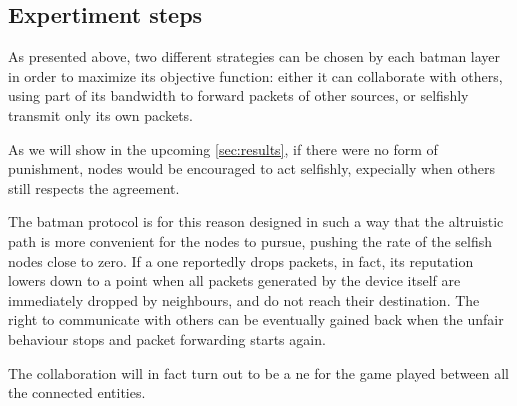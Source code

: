 \documentclass[conference]{IEEEtran}
\begin{document}
\begin{table}[h]
\vspace{0.1cm}
\caption{Relevant parameters for building the network}
\label{tab:params}
\end{table}

\subsection{Expertiment steps}

As presented above, two different strategies can be chosen by each \gls{batman} layer in order to maximize its objective function: either it can collaborate with others, using part of its bandwidth to forward packets of other sources, or selfishly transmit only its own packets.

As we will show in the upcoming \autoref{sec:results}, if there were no form of punishment, nodes would be encouraged to act selfishly, expecially when others still respects the agreement.

The \gls{batman} protocol is for this reason designed in such a way that the altruistic path is more convenient for the nodes to pursue, pushing the rate of the selfish nodes close to zero.
If a one reportedly drops packets, in fact, its reputation lowers down to a point when all packets generated by the device itself are immediately dropped by neighbours, and do not reach their destination. The right to communicate with others can be eventually gained back when the unfair behaviour stops and packet forwarding starts again.

The collaboration will in fact turn out to be a \gls{ne} for the game played between all the connected entities.
\end{document}
